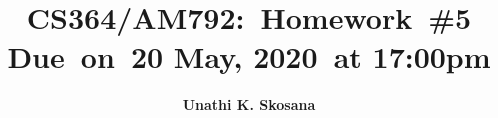 

\newcommand{\hmwkTitle}{Homework\ \#5}
\newcommand{\hmwkDueDate}{20 May, 2020}
\newcommand{\hmwkClass}{CS364/AM792}
\newcommand{\hmwkAuthorName}{\textbf{Unathi K. Skosana}}


\title{
    \vspace{2in}
    \textmd{\textbf{\hmwkClass:\ \hmwkTitle}}\\
    \normalsize\vspace{0.1in}\small{Due\ on\ \hmwkDueDate\ at 17:00pm}\\
    \vspace{3in}
}

\author{\hmwkAuthorName}
\date{}

\renewcommand{\part}[1]{\textbf{\large Part \Alph{partCounter}}\stepcounter{partCounter}\\}

\newcommand{\solution}{\textbf{\large Solution}}



\maketitle

\pagebreak

